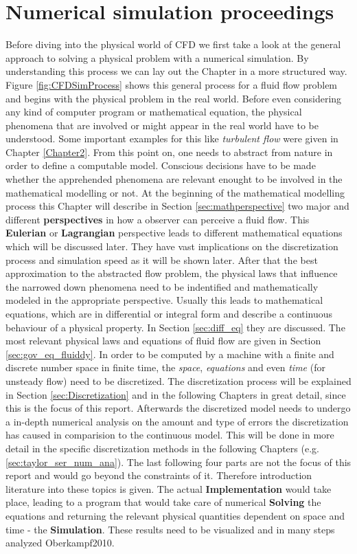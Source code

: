\section {Numerical simulation proceedings}
Before diving into the physical world of CFD we first take a look at the general approach to solving a physical problem with a numerical simulation. By understanding this process we can lay out the Chapter in a more structured way. Figure \ref{fig:CFDSimProcess} shows this general process for a fluid flow problem and begins with the physical problem in the real world. Before even considering any kind of
computer program or mathematical equation, the physical phenomena that are involved or might appear in the real world have to be understood. Some important examples for this like \emph{turbulent flow} were given in Chapter \ref{Chapter2}. From this point on, one needs to abstract from nature in order to define a computable model. Conscious decisions have to be made whether the apprehended phenomena are relevant enought to
be involved in the mathematical modelling or not. At the beginning of the mathematical modelling process this Chapter will describe in Section \ref{sec:mathperspective} two major and different \textbf{perspectives} in how a observer can perceive a fluid flow. This \textbf{Eulerian} or \textbf{Lagrangian} perspective leads to different mathematical equations which will be discussed later. They have vast implications on the discretization process and simulation speed as it will be shown later.  After that the best approximation to the abstracted flow problem, the physical laws that influence the narrowed down
phenomena need to be indentified and mathematically modeled in the appropriate perspective. Usually this leads to mathematical equations, which are in differential or integral form and describe a continuous behaviour of a physical property. In Section \ref{sec:diff_eq} they are discussed. The most relevant physical laws and equations of fluid flow are given in Section \ref{sec:gov_eq_fluiddy}. In order to be computed by a machine with a finite and discrete number space in
finite time, the \emph{space}, \emph{equations} and even \emph{time} (for unsteady flow) need to be discretized. The discretization process will be explained in Section \ref{sec:Discretization} and in the following Chapters in great detail, since this is the focus of this report. Afterwards the discretized model needs to undergo a in-depth numerical analysis on the amount and type of errors the discretization has caused in comparision to the continuous model. This will be done in more detail in the specific discretization methods in the following Chapters (e.g. \ref{sec:taylor_ser_num_ana}). 
The last following four parts are not the focus of this report and would go beyond the constraints of it. Therefore introduction literature into these topics is given.  
The actual \textbf{Implementation} would take place, leading to a program that would take care of numerical \textbf{Solving} the equations and returning the relevant physical quantities dependent on space and time - the \textbf{Simulation}. These results need to be visualized and in many steps analyzed Oberkampf2010.

